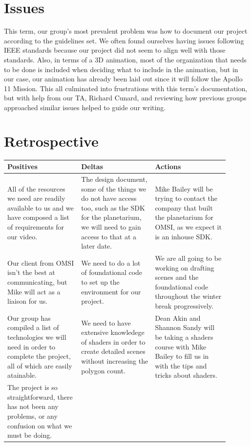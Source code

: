 \documentclass[onecolumn, draftclsnofoot,10pt, compsoc]{IEEEtran}
\begin{document}
\section{Issues}
This term, our group's most prevalent problem was how to document our project according to the guidelines set. We often found ourselves having issues following IEEE standards because our project did not seem to align well with those standards. Also, in terms of a 3D animation, most of the organization that needs to be done is included when deciding what to include in the animation, but in our case, our animation has already been laid out since it will follow the Apollo 11 Mission. This all culminated into frustrations with this term's documentation, but with help from our TA, Richard Cunard, and reviewing how previous groups approached similar issues helped to guide our writing. 

\section{Retrospective}

\begin{tabular}{|p{0.3\linewidth}|p{0.3\linewidth}|p{0.3\linewidth}|}
\hline
     Positives & Deltas & Actions  \\
    \hline
     All of the resources we need are readily available to us and we have composed a list of requirements for our video. & The design document, some of the things we do not have access too, such as the SDK for the planetarium, we will need to gain access to that at a later date. &Mike Bailey will be trying to contact the company that built the planetarium for OMSI, as we expect it is an inhouse SDK.\\ 
     \hline
     Our client from OMSI isn't the best at communicating, but Mike will act as a liaison for us.&We need to do a lot of foundational code to set up the environment for our project.&We are all going to be working on drafting scenes and the foundational code throughout the winter break progressively.\\
     \hline
     Our group has compiled a list of technologies we will need in order to complete the project, all of which are easily atainable.&We need to have extensive knowledege of shaders in order to create detailed scenes without increasing the polygon count.&Dean Akin and Shannon Sandy will be taking a shaders course with Mike Bailey to fill us in with the tips and tricks about shaders.\\
     \hline
     The project is so straightforward, there has not been any problems, or any confusion on what we must be doing.&&\\
     \hline
     
\end{tabular}
\end{document}
